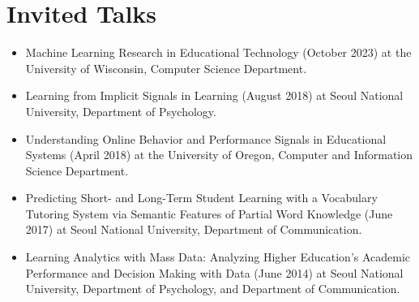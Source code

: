\documentclass[11pt,a4paper]{article}
\begin{document}
\section*{Invited Talks}
\begin{itemize}
    \item Machine Learning Research in Educational Technology (October 2023) at the University of Wisconsin, Computer Science Department.
    \item Learning from Implicit Signals in Learning (August 2018) at Seoul National University, Department of Psychology.
    \item Understanding Online Behavior and Performance Signals in Educational Systems (April 2018) at the University of Oregon, Computer and Information Science Department.
    \item Predicting Short- and Long-Term Student Learning with a Vocabulary Tutoring System via Semantic Features of Partial Word Knowledge (June 2017) at Seoul National University, Department of Communication.
    \item Learning Analytics with Mass Data: Analyzing Higher Education's Academic Performance and Decision Making with Data (June 2014) at Seoul National University, Department of Psychology, and Department of Communication.
\end{itemize}
\end{document}
